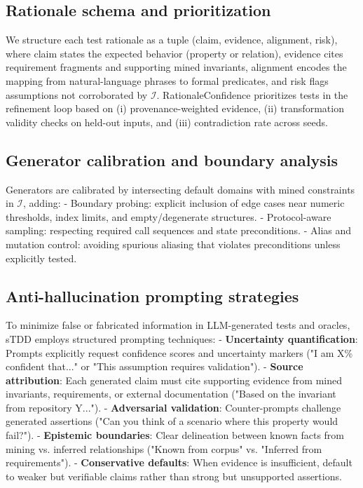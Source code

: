 \documentclass[10pt,twocolumn]{article}
\begin{document}
\subsection{Rationale schema and prioritization}
We structure each test rationale as a tuple (claim, evidence, alignment, risk), where claim states the expected behavior (property or relation), evidence cites requirement fragments and supporting mined invariants, alignment encodes the mapping from natural-language phrases to formal predicates, and risk flags assumptions not corroborated by $\mathcal{I}$. RationaleConfidence prioritizes tests in the refinement loop based on (i) provenance-weighted evidence, (ii) transformation validity checks on held-out inputs, and (iii) contradiction rate across seeds.

\subsection{Generator calibration and boundary analysis}
Generators are calibrated by intersecting default domains with mined constraints in $\mathcal{I}$, adding:
- Boundary probing: explicit inclusion of edge cases near numeric thresholds, index limits, and empty/degenerate structures.
- Protocol-aware sampling: respecting required call sequences and state preconditions.
- Alias and mutation control: avoiding spurious aliasing that violates preconditions unless explicitly tested.

\subsection{Anti-hallucination prompting strategies}
To minimize false or fabricated information in LLM-generated tests and oracles, sTDD employs structured prompting techniques:
- \textbf{Uncertainty quantification}: Prompts explicitly request confidence scores and uncertainty markers ("I am X\% confident that..." or "This assumption requires validation").
- \textbf{Source attribution}: Each generated claim must cite supporting evidence from mined invariants, requirements, or external documentation ("Based on the invariant from repository Y...").
- \textbf{Adversarial validation}: Counter-prompts challenge generated assertions ("Can you think of a scenario where this property would fail?").
- \textbf{Epistemic boundaries}: Clear delineation between known facts from mining vs. inferred relationships ("Known from corpus" vs. "Inferred from requirements").
- \textbf{Conservative defaults}: When evidence is insufficient, default to weaker but verifiable claims rather than strong but unsupported assertions.
\end{document}
